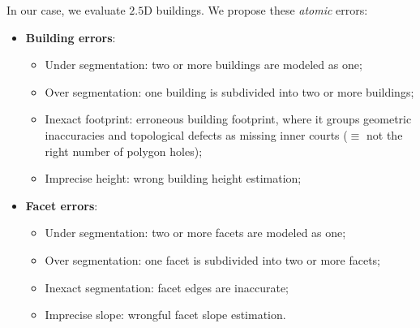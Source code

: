 \documentclass[runningheads]{llncs}
\begin{document}
In our case, we evaluate $2.5$D buildings. We propose these \textit{atomic} errors:
	\begin{itemize}
		\item \textbf{Building errors}:
        \begin{itemize}
        	\item Under segmentation: two or more buildings are modeled as one;
            \item Over segmentation: one building is subdivided into two or more buildings;
            \item Inexact footprint: erroneous building footprint, where it groups geometric inaccuracies and topological defects as missing inner courts ($\equiv$ not the right number of polygon holes);
            \item Imprecise height: wrong building height estimation;
        \end{itemize}
		\item \textbf{Facet errors}:
        \begin{itemize}
        	\item Under segmentation: two or more facets are modeled as one;
            \item Over segmentation: one facet is subdivided into two or more facets;
            \item Inexact segmentation: facet edges are inaccurate;
            \item Imprecise slope: wrongful facet slope estimation.
        \end{itemize}
	\end{itemize}
    
\end{document}
